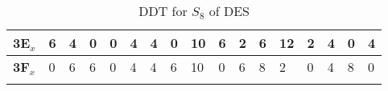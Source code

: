 \begin{longtable}[c]{|l|l|l|l|l|l|l|l|l|l|l|l|l|l|l|l|l|}
\textbf{3E$_x$} & 6              & 4              & 0              & 0              & 4              & 4              & 0              & 10             & 6              & 2              & 6              & 12             & 2              & 4              & 0              & 4              \\ \hline
\textbf{3F$_x$} & 0              & 6              & 6              & 0              & 4              & 4              & 6              & 10             & 0              & 6              & 8              & 2              & 0              & 4              & 8              & 0              \\ \hline
\caption{DDT for $S_8$ of DES}
\label{tab:ddt-s8-des}
\end{longtable}